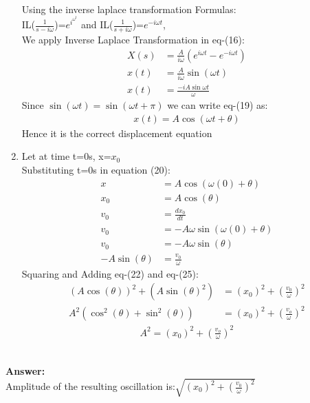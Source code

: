 \documentclass[journal,12pt,twocolumn]{IEEEtran}
\theoremstyle{remark}
\begin{document}
\begin{enumerate}
\begin{align}
\end{align}
Using the inverse laplace transformation Formulas:\\
IL($\frac{1}{s-i\omega}$)=$e^i^\omega^t$ and 
IL($\frac{1}{s+i\omega}$)=$e^{-i\omega{t}}$,\\
We apply Inverse Laplace Transformation in eq-(16):
\begin{align}
X(s) &= \frac{A}{i\omega} (e^{i\omega t} - e^{-i\omega t}) \\
x(t)&= \frac{A}{i\omega} \sin(\omega t)\\
x(t)&=\frac{-iA\sin{\omega{t}}}{\omega}
\end{align}
Since $\sin(\omega{t})=\sin(\omega{t}+\pi)$ we can write eq-(19) as:
\begin{align}
     x(t)= A \cos(\omega t + \theta)
\end{align}
Hence it is the correct displacement equation
\item{}
Let at time t=0s, x=$x_0$\\
Substituting t=0s in equation (20):
\begin{align}
x&=A\cos(\omega{(0)}+\theta{})\\
x_0&=A\cos(\theta{})\\
v_0&=\frac{dx_0}{dt}\\
v_0&=-A\omega{}\sin(\omega{(0)}+\theta{})\\
v_0&=-A\omega{}\sin(\theta{})\\
-A\sin(\theta{})&=\frac{v_0}{\omega{}}
\end{align}
Squaring and Adding eq-(22) and eq-(25):\\
\begin{align}
(A\cos(\theta{}))^2+(A\sin(\theta{})^2)
&=(x_0)^2+\left(\frac{v_0}{\omega{}}\right)^2\\
A^2(\cos^2(\theta{})+\sin^2(\theta{}))
&=(x_0)^2+\left(\frac{v_o}{\omega{}}\right)^2\end{align}
\begin{align}
A^2=(x_0)^2+(\frac{v_o}{\omega{}})^2
\end{align}
\end{enumerate}\\
\textbf{Answer:}\\
Amplitude of the resulting oscillation is:$\sqrt{(x_0)^2+(\frac{v_0}{\omega{}})^2}$
\end{document}
